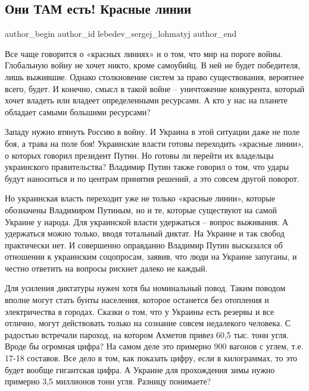  
 
 
 
 
\subsection{Они ТАМ есть! Красные линии}
\label{sec:24_11_2021.stz.news.nvr.voshod_info.1.oni_tam_est_krasnyje_linii}

\ifcmt
 author_begin
   author_id lebedev_sergej_lohmatyj
 author_end
\fi

Все чаще говорится о «красных линиях» и о том, что мир на пороге войны.
Глобальную войну не хочет никто, кроме самоубийц. В ней не будет победителя,
лишь выжившие. Однако столкновение систем за право существования, вероятнее
всего, будет. И конечно, смысл в такой войне – уничтожение конкурента, который
хочет владеть или владеет определенными ресурсами. А кто у нас на планете
обладает самыми большими ресурсами?

Западу нужно втянуть Россию в войну. И Украина в этой ситуации даже не поле
боя, а трава на поле боя! Украинские власти готовы переходить «красные линии»,
о которых говорил президент Путин. Но готовы ли перейти их владельцы
украинского правительства? Владимир Путин также говорил о том, что удары будут
наноситься и по центрам принятия решений, а это совсем другой поворот.


Но украинская власть переходит уже не только «красные линии», которые
обозначены Владимиром Путиным, но и те, которые существуют на самой Украине у
народа. Для украинской власти удержаться – вопрос выживания. А удержаться можно
только, вводя тотальный диктат. На Украине и так свобод практически нет. И
совершенно оправданно Владимир Путин высказался об отношении к украинским
соцопросам, заявив, что люди на Украине запуганы, и честно ответить на вопросы
рискнет далеко не каждый.

Для усиления диктатуры нужен хотя бы номинальный повод. Таким поводом вполне
могут стать бунты населения, которое останется без отопления и электричества в
городах. Сказки о том, что у Украины есть резервы и все отлично, могут
действовать только на сознание совсем недалекого человека. С радостью встречали
пароход, на котором Ахметов привез 60,5 тыс. тонн угля. Вроде бы огромная
цифра? На самом деле это примерно 900 вагонов с углем, т.е. 17-18 составов. Все
дело в том, как показать цифру, если в килограммах, то это будет вообще
гигантская цифра. А Украине для прохождения зимы нужно примерно 3,5 миллионов
тонн угля. Разницу понимаете?

